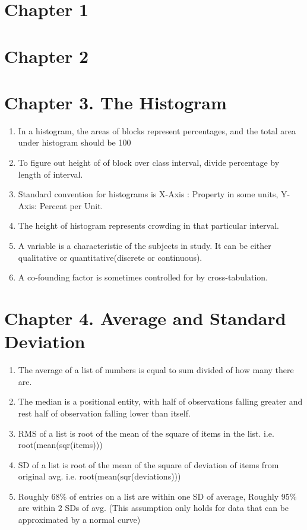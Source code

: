 \documentclass[10pt,a4paper]{article}
\begin{document}
	\section{Chapter 1}
	\section{Chapter 2}
	\section{Chapter 3. The Histogram}
	
	\begin{enumerate}
		\item In a histogram, the areas of blocks represent percentages, and the total area under histogram should be 100%
		\item To figure out height of of block over class interval, divide percentage by length of interval.
		\item Standard convention for histograms is X-Axis : Property in some units, Y-Axis: Percent per Unit.
		\item The height of histogram represents crowding in that particular interval.
		\item A variable is a characteristic of the subjects in study. It can be either qualitative or quantitative(discrete or continuous).
		\item A co-founding factor is sometimes controlled for by cross-tabulation.	
	\end{enumerate}
	
	\section{Chapter 4. Average and Standard Deviation}
	
	\begin{enumerate}
		\item The average of a list of numbers is equal to sum divided of how many there are.
		\item The median is a positional entity, with half of observations falling greater and rest half of observation falling lower than itself.
		\item RMS of a list is root of the mean of the square of items in the list. i.e. root(mean(sqr(items)))
		\item SD of a list is root of the mean of the square of deviation of items from original avg. i.e. root(mean(sqr(deviations)))
		\item Roughly 68\% of entries on a list are within one SD of average, Roughly 95\% are within 2 SDs of avg. (This assumption only holds for data that can be approximated by a normal curve)
		
	\end{enumerate}
\end{document}
